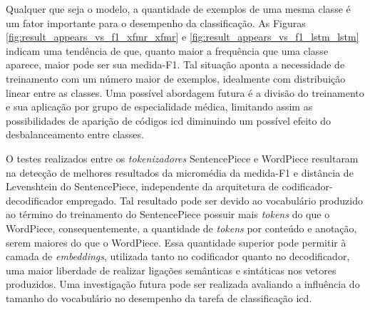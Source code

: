 Qualquer que seja o modelo, a quantidade de exemplos de uma mesma classe é um fator importante para o desempenho da classificação. As Figuras \ref{fig:result_appears_vs_f1_xfmr_xfmr} e \ref{fig:result_appears_vs_f1_lstm_lstm} indicam uma tendência de que, quanto maior a frequência que uma classe aparece, maior pode ser sua medida-F1. Tal situação aponta a necessidade de treinamento com um número maior de exemplos, idealmente com distribuição linear entre as classes. Uma possível abordagem futura é a divisão do treinamento e sua aplicação por grupo de especialidade médica, limitando assim as possibilidades de aparição de códigos \gls{icd} diminuindo um possível efeito do desbalanceamento entre classes.

O testes realizados entre os \textit{tokenizadores} SentencePiece e WordPiece resultaram na detecção de melhores resultados da micromédia da medida-F1 e distância de Levenshtein do SentencePiece, independente da arquitetura de codificador-decodificador empregado. Tal resultado pode ser devido ao vocabulário produzido ao término do treinamento do SentencePiece possuir mais \textit{tokens} do que o WordPiece, consequentemente, a quantidade de \textit{tokens} por conteúdo e anotação, serem maiores do que o WordPiece. Essa quantidade superior pode permitir à camada de \textit{embeddings}, utilizada tanto no codificador quanto no decodificador, uma maior liberdade de realizar ligações semânticas e sintáticas nos vetores produzidos. Uma investigação futura pode ser realizada avaliando a influência do tamanho do vocabulário no desempenho da tarefa de classificação \gls{icd}.